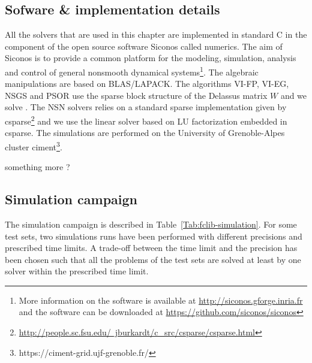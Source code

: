 
\subsection{Sofware \& implementation details}

All the solvers that are used in this chapter are implemented in standard C in the component of the open source software Siconos called numerics. The aim of Siconos is to provide a common platform for the modeling, simulation, analysis and control of general nonsmooth dynamical systems\footnote{More information on the software is available at \href{http://siconos.gforge.inria.fr}{http://siconos.gforge.inria.fr} and the software can be downloaded at  \href{https://github.com/siconos/siconos}{https://github.com/siconos/siconos}}. The algebraic manipulations are based on BLAS/LAPACK. The algorithms {\sf VI-FP}, {\sf VI-EG}, {\sf NSGS} and {\sf PSOR} use the sparse block structure of the Delassus matrix $W$ and we solve . The {\sf NSN} solvers relies on a standard sparse implementation given by csparse\footnote{\href{http://people.sc.fsu.edu/~jburkardt/c_src/csparse/csparse.html}{http://people.sc.fsu.edu/~jburkardt/c\_src/csparse/csparse.html}} and we use the linear solver based on LU factorization embedded in csparse. The simulations are performed on the University of Grenoble-Alpes cluster {\sc ciment}\footnote{https://ciment-grid.ujf-grenoble.fr/}.





\begin{ndrva}
 something more ?
\end{ndrva}

\subsection{Simulation campaign}
The simulation campaign is described in Table~\ref{Tab:fclib-simulation}. For some test sets, two simulations runs have been performed with different precisions and prescribed time limits. A trade-off between the time limit and the precision has been chosen such that all the problems of the test sets are solved at least by one solver within the prescribed time limit.


